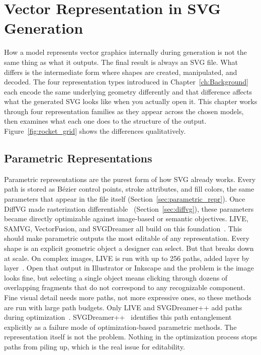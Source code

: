 \chapter{Vector Representation in SVG Generation}
\label{ch:representation}

How a model represents vector graphics internally during generation is not the same thing as what it outputs. 
The final result is always an SVG file. What differs is the intermediate form where shapes are created,
manipulated, and decoded. The four representation types introduced in Chapter~\ref{ch:Background} each encode the same underlying
geometry differently and that difference affects what the generated SVG looks like when you actually open it.
This chapter works through four representation families as they appear across the chosen models, 
then examines what each one does to the structure of the output. 
Figure~\ref{fig:rocket_grid} shows the differences qualitatively.

\section{Parametric Representations}
\label{sec:parametric}

Parametric representations are the purest form of how SVG already works. Every path is stored as B\'{e}zier control points, 
stroke attributes, and fill colors, the same parameters that appear in the file itself (Section~\ref{sec:parametric_repr}). 
Once DiffVG made rasterization differentiable~\cite{liDifferentiableVectorGraphics2020a} (Section~\ref{sec:diffvg}), 
these parameters became directly optimizable against image-based or semantic objectives. LIVE, SAMVG, VectorFusion, 
and SVGDreamer all build on this foundation~\cite{maLayerwiseImageVectorization2022, zhuSAMVGMultistageImage2023, 
jainVectorFusionTexttoSVGAbstracting2022, xingSVGDreamerTextGuided2024}.
This should make parametric outputs the most editable of any representation. Every shape is an explicit geometric object a designer can select. 
But that breaks down at scale. On complex images, LIVE is run with up to 256 paths, added layer by layer~\cite{maLayerwiseImageVectorization2022}. 
Open that output in Illustrator or Inkscape and the problem is the image looks fine, 
but selecting a single object means clicking through dozens of overlapping fragments that do not correspond to any recognizable component. 
Fine visual detail needs more paths, not more expressive ones, so these methods are run with large path budgets. 
Only LIVE and SVGDreamer++ add paths during optimization~\cite{maLayerwiseImageVectorization2022, xingSVGDreamerAdvancingEditability2025}. 
SVGDreamer++~\cite{xingSVGDreamerAdvancingEditability2025} identifies this path entanglement explicitly as a failure mode of optimization-based parametric methods.
The representation itself is not the problem. Nothing in the optimization process stops paths from piling up, which is the real issue for editability.


